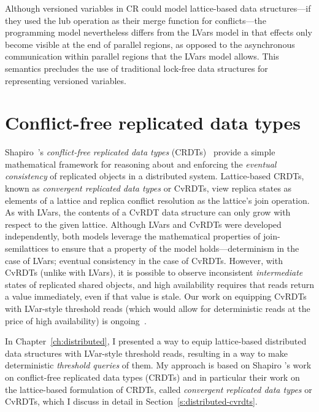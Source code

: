 Although versioned variables in CR could model lattice-based data
structures---if they used the lub operation as their merge function
for conflicts---the programming model nevertheless differs from the
LVars model in that effects only become visible at the end of parallel
regions, as opposed to the asynchronous communication within parallel
regions that the LVars model allows.  This semantics precludes the use
of traditional lock-free data structures for representing versioned
variables.

\section{Conflict-free replicated data types}
\ifdefined\JOURNAL

Shapiro~\etal's \emph{conflict-free replicated data types}
(CRDTs)~ provide a simple mathematical framework
for reasoning about and enforcing the \emph{eventual consistency} of
replicated objects in a distributed system.  Lattice-based CRDTs,
known as \emph{convergent replicated data types} or CvRDTs, view
replica states as elements of a lattice and replica conflict
resolution as the lattice's join operation.  As with LVars, the
contents of a CvRDT data structure can only grow with respect to the
given lattice.  Although LVars and CvRDTs were developed
independently, both models leverage the mathematical properties of
join-semilattices to ensure that a property of the model
holds---determinism in the case of LVars; eventual consistency in the
case of CvRDTs.  However, with CvRDTs (unlike with LVars), it is
possible to observe inconsistent \emph{intermediate} states of
replicated shared objects, and high availability requires that reads
return a value immediately, even if that value is stale.  Our work on
equipping CvRDTs with LVar-style threshold reads (which would allow
for deterministic reads at the price of high availability) is
ongoing~\cite{joining-wodet, lvars-dissertation}.  \fi

\ifdefined\DISSERTATION
In Chapter~\ref{ch:distributed}, I presented a way to equip
lattice-based distributed data structures with LVar-style threshold
reads, resulting in a way to make deterministic \emph{threshold
  queries} of them.  My approach is based on Shapiro \etal's work on
conflict-free replicated data types (CRDTs) \cite{crdts,crdts-tr} and
in particular their work on the lattice-based formulation of CRDTs,
called \emph{convergent replicated data types} or CvRDTs, which I
discuss in detail in Section~\ref{s:distributed-cvrdts}.

